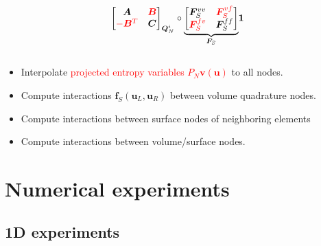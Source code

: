 \documentclass[compress]{beamer}
\theoremstyle{plain}
\renewcommand{\note}[1]{\textcolor{red}{{#1}}}
\begin{document}
{\begin{columns}
\begin{column}{.5\textwidth}
\[{{{\begin{bmatrix}
\bm{A} & \note{\bm{B}}\\
\note{-\bm{B}^T} & \bm{C}
\end{bmatrix}}_{\bm{Q}_N^i} \circ
\underbrace{\begin{bmatrix}
\bm{F}^{vv}_S & \note{\bm{F}^{vf}_S}\\
\note{\bm{F}^{fv}_S} & \bm{F}^{ff}_S
\end{bmatrix}}_{\bm{F}_S} } \bm{1}
}
\]
\end{column}
\end{columns}
\vspace{.5em}
\begin{itemize}
\item<1-> Interpolate \note{projected entropy variables $P_N \bm{v}(\bm{u})$} to all nodes.  
\item<2-> Compute interactions $\bm{f}_S(\bm{u}_L, \bm{u}_R)$ between volume quadrature nodes.
\item<3-> Compute interactions between surface nodes of neighboring elements
\item<4-> Compute interactions between volume/surface nodes.
\end{itemize} 
}


\section{Numerical experiments}

\subsection{1D experiments }

\end{document}
